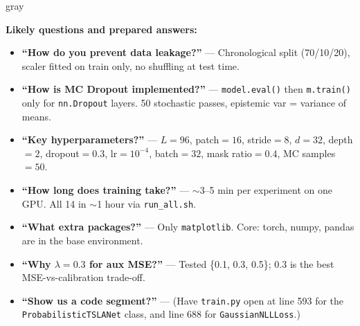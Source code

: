 \documentclass[11pt,a4paper]{article}
\begin{document}
\begin{speakerbox}{gray}

\textbf{Likely questions and prepared answers:}
\begin{itemize}[leftmargin=*]
    \item \textbf{``How do you prevent data leakage?''} --- Chronological split (70/10/20), scaler fitted on train only, no shuffling at test time.
    \item \textbf{``How is MC Dropout implemented?''} --- \texttt{model.eval()} then \texttt{m.train()} only for \texttt{nn.Dropout} layers. 50 stochastic passes, epistemic var = variance of means.
    \item \textbf{``Key hyperparameters?''} --- $L\!=\!96$, patch$\!=\!16$, stride$\!=\!8$, $d\!=\!32$, depth$\!=\!2$, dropout$\!=\!0.3$, lr$\!=\!10^{-4}$, batch$\!=\!32$, mask ratio$\!=\!0.4$, MC samples$\!=\!50$.
    \item \textbf{``How long does training take?''} --- $\sim$3--5 min per experiment on one GPU. All 14 in $\sim$1 hour via \texttt{run\_all.sh}.
    \item \textbf{``What extra packages?''} --- Only \texttt{matplotlib}. Core: torch, numpy, pandas are in the base environment.
    \item \textbf{``Why $\lambda = 0.3$ for aux MSE?''} --- Tested \{0.1, 0.3, 0.5\}; 0.3 is the best MSE-vs-calibration trade-off.
    \item \textbf{``Show us a code segment?''} --- (Have \texttt{train.py} open at line 593 for the \texttt{ProbabilisticTSLANet} class, and line 688 for \texttt{GaussianNLLLoss}.)
\end{itemize}
\end{speakerbox}
\end{document}
